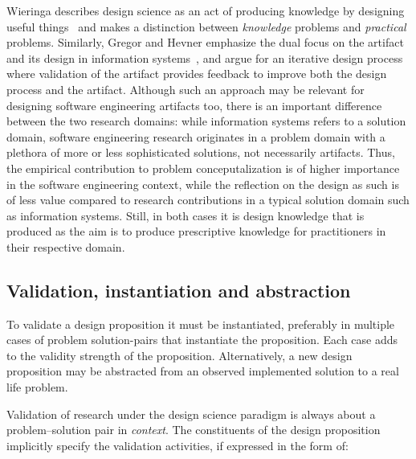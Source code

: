 \documentclass[graybox]{svmult}
\begin{document}
Wieringa describes design science as an act of producing knowledge by designing useful things~\cite{wieringa_design_2009} and makes a distinction between \emph{knowledge} problems and \emph{practical} problems. Similarly, Gregor and Hevner emphasize the dual focus on the artifact and its design in information systems~\cite{gregor_positioning_2013}, and argue for an iterative design process where validation of the artifact provides feedback  to improve both the design process and the artifact. Although such an approach may be relevant for designing software engineering artifacts too, there is an important difference between the two research domains: while information systems refers to a solution domain, software engineering research originates in a problem domain with a plethora of more or less sophisticated solutions, not necessarily artifacts. Thus, the empirical contribution to problem conceputalization is of higher importance in the software engineering context, while the reflection on the design as such is of less value compared to research contributions in a typical solution domain such as information systems. Still, in both cases it is design knowledge that is produced as the aim is to produce prescriptive knowledge for practitioners in their respective domain. 

 

\subsection{Validation, instantiation and abstraction}

To validate a design proposition it must be instantiated, preferably in multiple cases of problem solution-pairs that instantiate the proposition. Each case adds to the validity strength of the proposition. Alternatively,  a new design proposition may be abstracted from an observed implemented solution to a real life problem.

Validation of research under the design science paradigm is always about a problem--solution pair in \emph{context}. The constituents of the design proposition implicitly specify the validation activities, if expressed in the form of:
\end{document}
